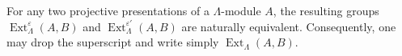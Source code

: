 For any two projective presentations of a $\Lambda$-module $A$, the resulting groups $\operatorname{Ext}_{\Lambda}^{\varepsilon}(A, B)$ and $\operatorname{Ext}_{\Lambda}^{\varepsilon'}(A, B)$ are naturally equivalent. Consequently, one may drop the superscript and write simply $\operatorname{Ext}_{\Lambda}(A, B)$.
